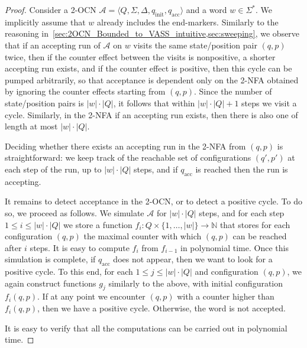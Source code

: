 \documentclass[11pt,a4paper]{amsart}
\theoremstyle{definition}
\newcommand{\tup}[1]{\langle #1 \rangle}
\newcommand{\initstate}{q_{\mathrm{init}}}
\newcommand{\accstate}{q_{\mathrm{acc}}}
\newcommand{\bbN}{\mathbb{N}}
\newcommand{\cA}{\mathcal{A}}
\begin{document}
\begin{proof} 
	Consider a 2-OCN $\cA=\tup{Q,\Sigma,\Delta,\initstate,\accstate}$ and a word
	$w\in \Sigma^*$. We implicitly assume that $w$ already includes the end-markers.
	Similarly to the reasoning 
	in~\cref{sec:2OCN_Bounded_to_VASS_intuitive,sec:sweeping}, we observe that
	if an accepting run of $\cA$ on $w$ visits the same state/position pair
	$(q,p)$ twice, then if the counter effect between the visits is
	nonpositive, a shorter accepting run exists, and if the counter effect
	is positive, then this cycle can be pumped arbitrarily, so that acceptance
	is dependent only on the 2-NFA obtained by ignoring the counter effects starting from $(q,p)$.
	Since the number of state/position pairs is $|w|\cdot |Q|$, it follows that
	within $|w|\cdot |Q|+1$ steps we visit a cycle. Similarly, in the 2-NFA if an accepting run exists, then there is also one of length at most $|w|\cdot |Q|$.
	
	Deciding whether there exists an accepting run in the 2-NFA from $(q,p)$ is straightforward: we keep track of the reachable set of configurations $(q',p')$ at each step of the run, up to $|w|\cdot |Q|$ steps, and if $\accstate$ is reached then the run is accepting.
	
	It remains to detect acceptance in the 2-OCN, or to detect a positive cycle. To do so, we proceed as follows. We simulate $\cA$ for $|w|\cdot |Q|$ steps, and for each step $1\le i\le |w|\cdot |Q|$ we store a function $f_i\colon Q\times \{1,\ldots,|w|\}\to \bbN$ that stores for each configuration $(q,p)$ the maximal counter with which $(q,p)$ can be reached after $i$ steps. It is easy to compute $f_i$ from $f_{i-1}$ in polynomial time. Once this simulation is complete, if $\accstate$ does not appear, then we want to look for a positive cycle.
	To this end, for each $1\le j\le |w|\cdot |Q|$ and configuration $(q,p)$, we again construct functions $g_j$ similarly to the above, with initial configuration $f_i(q,p)$. If at any point we encounter $(q,p)$ with a counter higher than $f_i(q,p)$, then we have a positive cycle. Otherwise, the word is not accepted.
	
	It is easy to verify that all the computations can be carried out in polynomial time.
\end{proof}
\end{document}
